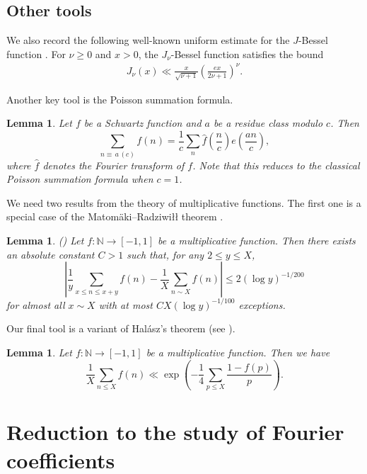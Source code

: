 \documentclass[a4paper,10pt,twoside]{amsart}
\newtheorem{lemma}[theorem]{Lemma}
\theoremstyle{definition}
\numberwithin{equation}{section}
\renewcommand\:{\colon}
\begin{document}
\subsection{Other tools}

\noindent We also record the following well-known uniform estimate for the $J$-Bessel function \cite[(2.11'')]{Iwaniec-Luo-Sarnak2000}. For $\nu\geq 0$ and $x>0$, the $J_\nu$-Bessel function satisfies the bound 
\begin{align}\label{J-Bessel}
J_\nu(x)\ll\frac x{\sqrt{\nu+1}}\left(\frac{ex}{2\nu+1}\right)^\nu.
\end{align}

\noindent Another key tool is the Poisson summation formula.

\begin{lemma}\label{Poisson}
Let $f$ be a Schwartz function and $a$ be a residue class modulo $c$. Then
\[\sum_{n\equiv\,a\,(c)}f(n)=\frac1c\sum_n\widehat f\left(\frac nc\right)e\left(\frac{an}c\right),\]
where $\widehat f$ denotes the Fourier transform of $f$. Note that this reduces to the classical Poisson summation formula when $c=1$. 
\end{lemma}

\noindent We need two results from the theory of multiplicative functions. The first one is a special case of the Matom\"aki--Radziwi{\l\l} theorem \cite[Theorem 1]{Matomaki-Radziwill2016}.

\begin{lemma}\label{MR} (\cite[Lemma 3.2]{Lester-Matomaki-Radziwill2018})
Let $f:\mathbb N\longrightarrow[-1,1]$ be a multiplicative function. Then there exists an absolute constant $C>1$ such that, for any $2\leq y\leq X$,
\[ 
\left|\frac1y\sum_{x\leq n\leq x+y}f(n)-\frac1X\sum_{n\sim X}f(n)\right|\leq 2(\log y)^{-1/200}\]
for almost all $x\sim X$ with at most $CX(\log y)^{-1/100}$ exceptions.
\end{lemma}

\noindent Our final tool is a variant of Hal\'asz's theorem (see \cite[(6)]{Hall-Tenenbaum1991}).

\begin{lemma}\label{Halasz}
Let $f:\mathbb N\longrightarrow[-1,1]$ be a multiplicative function. Then we have
\[ 
\frac1X\sum_{n\leq X}f(n)\ll \exp\left(-\frac14\sum_{p\leq X}\frac{1-f(p)}p\right).\]
\end{lemma}
 
\section{Reduction to the study of Fourier coefficients}
\end{document}
